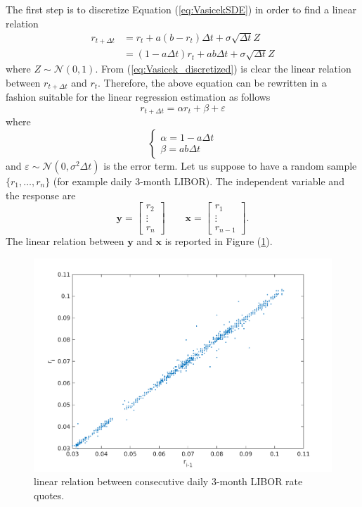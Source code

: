 The first step is to discretize Equation (\ref{eq:VasicekSDE}) in order to find a linear relation 
\begin{align}\label{eq:Vasicek_discretized}
\nonumber
r_{t+\Delta t} & = r_t + a(b-r_t)\Delta t+\sigma\sqrt{\Delta t}Z \\
& = (1-a\Delta t)r_t+ab\Delta t+\sigma\sqrt{\Delta t}Z
\end{align}
where $Z \sim \mathcal{N}(0,1)$. From (\ref{eq:Vasicek_discretized}) is clear the linear relation between $r_{t+\Delta t}$ and $r_t$. Therefore, the above equation can be rewritten in a fashion suitable for the linear regression estimation as follows
\[
r_{t+\Delta t} = \alpha r_t + \beta + \varepsilon
\]
where 
\begin{equation*}
\begin{cases*}
\alpha = 1-a\Delta t\\
\beta = ab\Delta t
\end{cases*}
\end{equation*}
and $\varepsilon \sim \mathcal{N}(0,\sigma^2\Delta t)$ is the error term. Let us suppose to have a random sample $\{r_1,\ldots,r_n\}$ (for example daily 3-month LIBOR). The independent variable and the response are
\[ \bm{y} = \begin{bmatrix}
r_2\\
\vdots\\
r_n
\end{bmatrix} \qquad
\bm{x}= \begin{bmatrix}
r_1\\
\vdots\\
r_{n-1}
\end{bmatrix}.
\]
The linear relation between $\bm{y}$ and $\bm{x}$ is reported in Figure (\ref{fig:linear_regression}).

\begin{figure}
	\centering
	\includegraphics[scale=0.5]{Images/LinearRegression}
	\caption{linear relation between consecutive daily 3-month LIBOR rate quotes. }
	\label{fig:linear_regression}
\end{figure}


